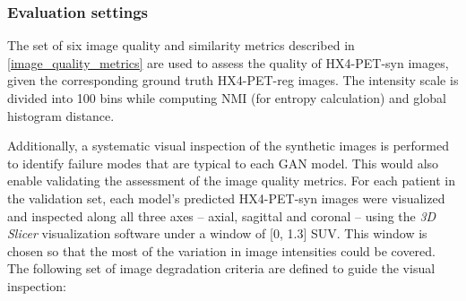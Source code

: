 \subsubsection{Evaluation settings}
The set of six image quality and similarity metrics described in \ref{image_quality_metrics} are used to assess the quality of HX4-PET-syn images, given the corresponding ground truth HX4-PET-reg images. The intensity scale is divided into 100 bins while computing NMI (for entropy calculation) and global histogram distance.

Additionally, a systematic visual inspection of the synthetic images is performed to identify failure modes that are typical to each GAN model. This would also enable validating the assessment of the image quality metrics. For each patient in the validation set, each model's predicted HX4-PET-syn images were visualized and inspected along all three axes -- axial, sagittal and coronal -- using the \textit{3D Slicer} visualization software under a window of [0, 1.3] SUV. This window is chosen so that the most of the variation in image intensities could be covered. The following set of image degradation criteria are defined to guide the visual inspection:

